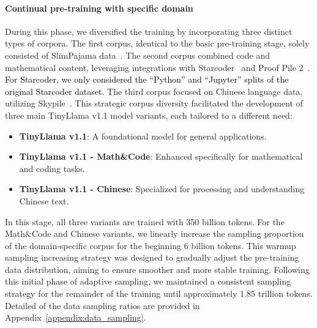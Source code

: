 \documentclass{article}
\begin{document}
\paragraph{Continual pre-training with specific domain}
During this phase, we diversified the training by incorporating three distinct types of corpora. The first corpus, identical to the basic pre-training stage, solely consisted of SlimPajama data~\citep{cerebras2023slimpajama}. The second corpus combined code and mathematical content, leveraging integrations with Starcoder~\citep{li2023starcoder} and Proof Pile 2~\citep{azerbayev2023llemma}.
\textcolor{black}{For Starcoder, we only considered the ``Python'' and ``Jupyter'' splits of the original Starcoder dataset.}
The third corpus focused on Chinese language data, utilizing Skypile~\citep{wei2023skywork}.  This strategic corpus diversity facilitated the development of three main TinyLlama v1.1 model variants, each tailored to a different need:
\begin{itemize}
\item \textbf{TinyLlama v1.1}: A foundational model for general applications.
\item \textbf{TinyLlama v1.1 - Math\&Code}: Enhanced specifically for mathematical and coding tasks.
\item \textbf{TinyLlama v1.1 - Chinese}: Specialized for processing and understanding Chinese text.
\end{itemize}
In this stage, all three variants are trained with 350 billion tokens.
For the Math\&Code and Chinese variants, we linearly increase the sampling proportion of the domain-specific corpus for the beginning 6 billion tokens.
This warmup sampling increasing strategy was designed to gradually adjust the pre-training data distribution, aiming to ensure smoother and more stable training.
Following this initial phase of adaptive sampling, we maintained a consistent sampling strategy for the remainder of the training until approximately 1.85 trillion tokens. Detailed of the data sampling ratios are provided in Appendix~\ref{appendix:data_sampling}.
\vspace{-1em}
\end{document}
